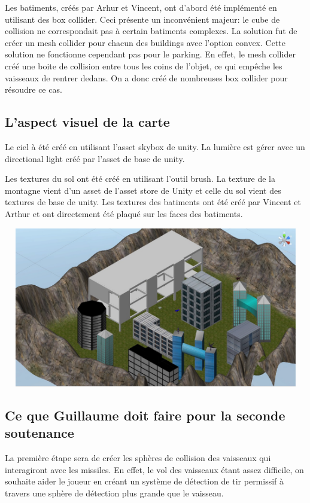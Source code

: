 \documentclass[10pt, titlepage]{report}
\begin{document}
Les batiments, créés par Arhur et Vincent, ont d'abord été implémenté en utilisant des box collider. Ceci présente un inconvénient majeur: le cube de collision ne correspondait pas à certain batiments complexes. La solution fut de créer un mesh collider pour chacun des buildings avec l'option convex. Cette solution ne fonctionne cependant pas pour le parking. En effet, le mesh collider créé une boite de collision entre tous les coins de l'objet, ce qui empêche les vaisseaux de rentrer dedans. On a donc créé de nombreuses box collider pour résoudre ce cas.

\subsection{L'aspect visuel de la carte}

Le ciel à été créé en utilisant l'asset skybox de unity. La lumière est gérer avec un directional light créé par l'asset de base de unity.

Les textures du sol ont été créé en utilisant l'outil brush. La texture de la montagne vient d'un asset de l'asset store de Unity et celle du sol vient des textures de base de unity. Les textures des batiments ont été créé par Vincent et Arthur et ont directement été plaqué sur les faces des batiments.

\begin{center}
\includegraphics[height=7cm, width=13.54cm]{niveau_guillaume.jpg}\\
\end{center}

\subsection{Ce que Guillaume doit faire pour la seconde soutenance}

La première étape sera de créer les sphères de collision des vaisseaux qui interagiront avec les missiles. En effet, le vol des vaisseaux étant assez difficile, on souhaite aider le joueur en créant un système de détection de tir permissif à travers une sphère de détection plus grande que le vaisseau.\\
\end{document}
